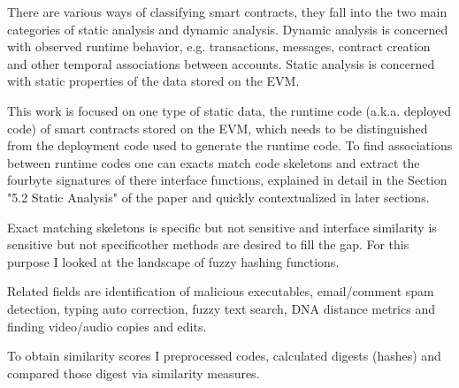 \documentclass[../main.tex]{subfiles}
\begin{document}
There are various ways of classifying smart contracts, they fall into the two main categories of
static analysis and dynamic analysis.
Dynamic analysis is concerned with observed runtime behavior, e.g. transactions, messages, contract creation and other temporal associations between accounts.
Static analysis is concerned with static properties of the data stored on the EVM.

This work is focused on one type of static data, the runtime code (a.k.a. deployed code) of smart contracts stored on the EVM, which needs to be distinguished from the deployment code used to generate the runtime code.
To find associations between runtime codes one can exacts match code skeletons  and extract the fourbyte signatures  of there interface functions, explained in detail in the Section "5.2 Static Analysis" of the paper  and quickly contextualized in later sections.

Exact matching skeletons is specific but not sensitive and interface similarity is sensitive but not specific\textemdash{}other methods are desired to fill the gap. For this purpose I looked at the landscape of fuzzy hashing functions.

Related fields are identification of malicious executables, email/comment spam detection, typing auto correction, fuzzy text search, DNA distance metrics and finding video/audio copies and edits.

To obtain similarity scores I preprocessed codes, calculated digests (hashes) and compared those digest via similarity measures.

\end{document}
